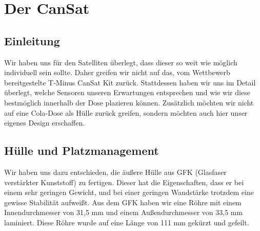 \section{Der CanSat}
\subsection{Einleitung}
Wir haben uns für den Satelliten überlegt, dass dieser so weit wie möglich individuell sein sollte. Daher greifen wir nicht auf das, vom Wettbewerb bereitgestelte T-Minus CanSat Kit zurück. Stattdessen haben wir uns im Detail überlegt, welche Sensoren unseren Erwartungen entsprechen und wie wir diese bestmöglich innerhalb der Dose plazieren können. Zusätzlich möchten wir nicht auf eine Cola-Dose als Hülle zurück greifen, sondern möchten auch hier unser eigenes Design erschaffen.

\subsection {Hülle und Platzmanagement}
Wir haben uns dazu entschieden, die äußere Hülle aus GFK (Glasfaser verstärkter Kunststoff) zu fertigen. Dieser hat die Eigenschaften, dass er bei einem sehr geringen Gewicht, und bei einer geringen Wandstärke trotzdem eine gewisse Stabilität aufweißt. Aus dem GFK haben wir eine Röhre mit einem Innendurchmesser von 31,5 mm und einem Außendurchmesser von 33,5 mm laminiert. Diese Röhre wurde auf eine Länge von 111 mm gekürzt und gefeilt.  